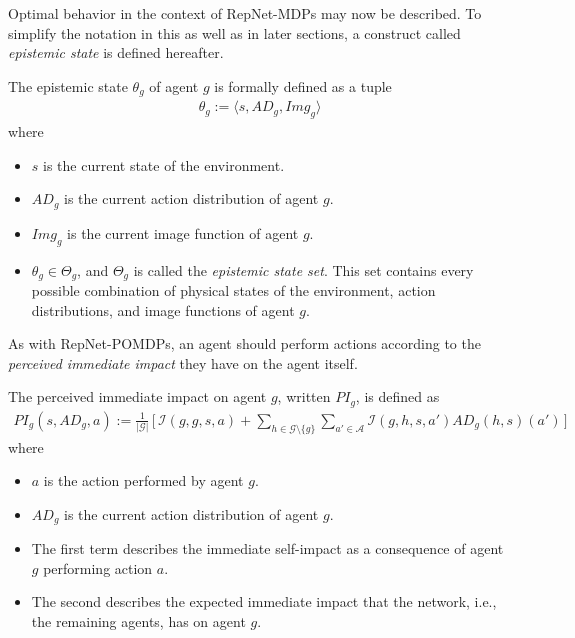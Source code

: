Optimal behavior in the context of RepNet-MDPs may now be described. To simplify the notation in this as well as in later sections, a construct called \textit{epistemic state} is defined hereafter.
\begin{definition}
\label{def:know}
The epistemic state $\theta_g$ of agent $g$ is formally defined as a tuple
\begin{align*}
     \theta_g := \big \langle s,  AD_g, Img_g \big \rangle
\end{align*}
where 
\begin{itemize}
    \item $s$ is the current state of the environment.
    \item $AD_g$ is the current action distribution of agent $g$.
    \item $Img_g$ is the current image function of agent $g$.
    \item $\theta_g \in \Theta_g$, and $\Theta_g$ is called the \textit{epistemic state set}. This set contains every possible combination of physical states of the environment, action distributions, and image functions of agent $g$.
\end{itemize}
\end{definition}
As with RepNet-POMDPs, an agent should perform actions according to the \textit{perceived immediate impact} they have on the agent itself. 
\label{sec:optimal}
\begin{definition}
The perceived immediate impact on agent $g$, written $PI_g$, is defined as
    \begin{align*}
        PI_g(s,AD_g, a) := \frac{1}{|\mathcal{G}|} \, \big[ \, \mathcal{I}(g,g,s,a) + \sum_{h \in \mathcal{G} \setminus \{ g \}}  \sum_{a' \in \mathcal{A}} \mathcal{I}(g, h, s, a') AD_g(h, s)(a') \, \big]
    \end{align*}
    where
    \begin{itemize}
        \item $a$ is the action performed by agent $g$.
        \item $AD_g$ is the current action distribution of agent $g$.
        \item The first term describes the immediate self-impact as a consequence of agent $g$ performing action $a$.
        \item The second describes the expected immediate impact that the network, i.e., the remaining agents, has on agent $g$.
    \end{itemize}
\end{definition}
